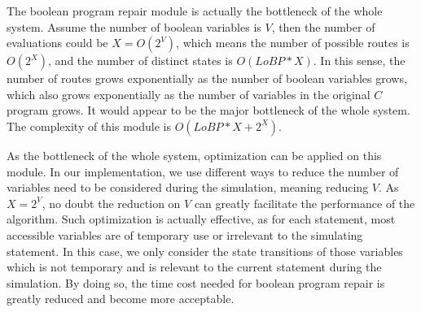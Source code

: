 \documentclass[10pt,journal,final,]{article}
\theoremstyle{definition}
\begin{document}
The boolean program repair module is actually the bottleneck of the whole system.
Assume the number of boolean variables is $V$, then the number of evaluations could be $X = O(2^{V})$, which means the number of possible routes is $O(2^{X})$,
and the number of distinct states is $O(LoBP * X)$.
In this sense, the number of routes grows exponentially as the number of boolean variables grows, which also grows exponentially as the number of variables in the original $C$ program grows. It would appear to be the major bottleneck of the whole system. The complexity of this module is $O(LoBP * X + 2^{X})$.

As the bottleneck of the whole system, optimization can be applied on this module.
In our implementation, we use different ways to reduce the number of variables need to be considered during the simulation, meaning reducing $V$.
As $X = 2^{V}$, no doubt the reduction on $V$ can greatly facilitate the performance of the algorithm.
Such optimization is actually effective, as for each statement, most accessible variables are of temporary use or irrelevant to the simulating statement.
In this case, we only consider the state transitions of those variables which is not temporary and is relevant to the current statement during the simulation.
By doing so, the time cost needed for boolean program repair is greatly reduced and become more acceptable.
\end{document}
